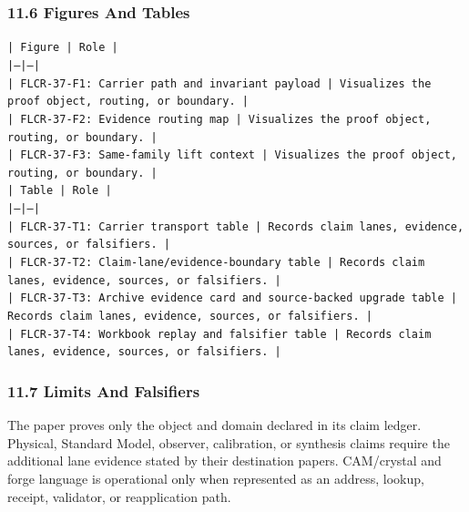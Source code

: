 \documentclass[11pt]{article}
\begin{document}
\subsubsection*{11.6 Figures And Tables}

\noindent\texttt{| Figure | Role |}\\
\noindent\texttt{|---|---|}\\
\noindent\texttt{| FLCR-37-F1: Carrier path and invariant payload | Visualizes the proof object, routing, or boundary. |}\\
\noindent\texttt{| FLCR-37-F2: Evidence routing map | Visualizes the proof object, routing, or boundary. |}\\
\noindent\texttt{| FLCR-37-F3: Same-family lift context | Visualizes the proof object, routing, or boundary. |}\\

\noindent\texttt{| Table | Role |}\\
\noindent\texttt{|---|---|}\\
\noindent\texttt{| FLCR-37-T1: Carrier transport table | Records claim lanes, evidence, sources, or falsifiers. |}\\
\noindent\texttt{| FLCR-37-T2: Claim-lane/evidence-boundary table | Records claim lanes, evidence, sources, or falsifiers. |}\\
\noindent\texttt{| FLCR-37-T3: Archive evidence card and source-backed upgrade table | Records claim lanes, evidence, sources, or falsifiers. |}\\
\noindent\texttt{| FLCR-37-T4: Workbook replay and falsifier table | Records claim lanes, evidence, sources, or falsifiers. |}\\

\subsubsection*{11.7 Limits And Falsifiers}

The paper proves only the object and domain declared in its claim ledger.
Physical, Standard Model, observer, calibration, or synthesis claims require
the additional lane evidence stated by their destination papers. CAM/crystal
and forge language is operational only when represented as an address, lookup,
receipt, validator, or reapplication path.
\end{document}
